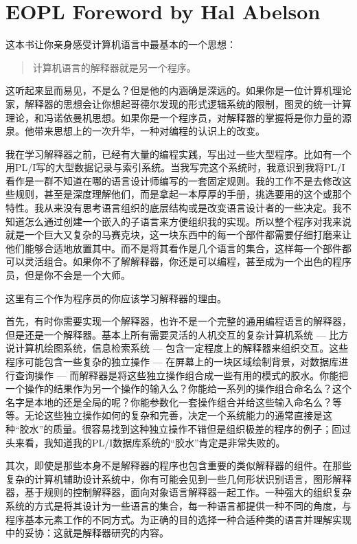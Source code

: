 \section*{EOPL\cite{friedman2001eopl} Foreword by Hal Abelson}

这本书让你亲身感受计算机语言中最基本的一个思想：

\begin{quotation}
计算机语言的解释器就是另一个程序。
\end{quotation}

这听起来显而易见，不是么？但是他的内涵确是深远的。如果你是一位计算机理论家，解释器的思想会让你想起哥德尔发现的形式逻辑系统的限制，图灵的统一计算理论，和冯诺依曼机思想。如果你是一个程序员，对解释器的掌握将是你力量的源泉。他带来思想上的一次升华，一种对编程的认识上的改变。

我在学习解释器之前，已经有大量的编程实践，写出过一些大型程序。比如有一个用PL/I写的大型数据记录与索引系统。当我写完这个系统时，我意识到我将PL/I看作是一群不知道在哪的语言设计师编写的一套固定规则。我的工作不是去修改这些规则，甚至是深度理解他们，而是拿起一本厚厚的手册，挑选要用的这个或那个特性。我从来没有思考语言组织的底层结构或是改变语言设计者的一些决定。我不知道怎么通过创建一个嵌入的子语言来方便组织我的实现。所以整个程序对我来说就是一个巨大又复杂的马赛克块，这一块东西中的每一个部件都需要仔细打磨来让他们能够合适地放置其中。而不是将其看作是几个语言的集合，这样每一个部件都可以灵活组合。如果你不了解解释器，你还是可以编程，甚至成为一个出色的程序员，但是你不会是一个大师。

这里有三个作为程序员的你应该学习解释器的理由。

首先，有时你需要实现一个解释器，也许不是一个完整的通用编程语言的解释器，但是还是一个解释器。基本上所有需要灵活的人机交互的复杂计算机系统 --- 比方说计算机绘图系统，信息检索系统 --- 包含一定程度上的解释器来组织交互。这些程序可能包含一些复杂的独立操作 --- 在屏幕上的一块区域绘制背景，对数据库进行查询操作 --- 而解释器是将这些独立操作组合成一些有用的模式的胶水。你能把一个操作的结果作为另一个操作的输入么？你能给一系列的操作组合命名么？这个名字是本地的还是全局的呢？你能参数化一套操作组合并给这些输入命名么？等等。无论这些独立操作如何的复杂和完善，决定一个系统能力的通常直接是这种``胶水''的质量。很容易找到这种独立操作不错但是组织极差的程序的例子；回过头来看，我知道我的PL/I数据库系统的``胶水''肯定是非常失败的。

其次，即使是那些本身不是解释器的程序也包含重要的类似解释器的组件。在那些复杂的计算机辅助设计系统中，你有可能会见到一些几何形状识别语言，图形解释器，基于规则的控制解释器，面向对象语言解释器一起工作。一种强大的组织复杂系统的方式是将其设计为一些语言的集合，每一种语言都提供一种不同的角度，与程序基本元素工作的不同方式。为正确的目的选择一种合适种类的语言并理解实现中的妥协：这就是解释器研究的内容。


